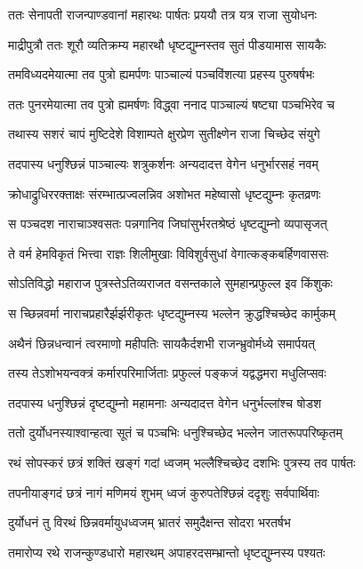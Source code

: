 \twolineshloka
{ततः सेनापती राजन्पाण्डवानां महारथः}
{पार्षतः प्रययौ तत्र यत्र राजा सुयोधनः}


\twolineshloka
{माद्रीपुत्रौ ततः शूरौ व्यतिक्रम्य महारथौ}
{धृष्टद्युम्नस्तव सुतं पीडयामास सायकैः}


\twolineshloka
{तमविध्यदमेयात्मा तव पुत्रो ह्यमर्पणः}
{पाञ्चाल्यं पञ्चविंशत्या प्रहस्य पुरुषर्षभः}


\twolineshloka
{ततः पुनरमेयात्मा तव पुत्रो ह्यमर्षणः}
{विद्ध्वा ननाद पाञ्चाल्यं षष्ट्या पञ्चभिरेव च}


\twolineshloka
{तथास्य सशरं चापं मुष्टिदेशे विशाम्पते}
{क्षुरप्रेण सुतीक्ष्णेन राजा चिच्छेद संयुगे}


\twolineshloka
{तदपास्य धनुश्छिन्नं पाञ्चाल्यः शत्रुकर्शनः}
{अन्यदादत्त वेगेन धनुर्भारसहं नवम्}


\twolineshloka
{क्रोधाद्रुधिररक्ताक्षः संरम्भात्प्रज्वलन्निव}
{अशोभत महेष्वासो धृष्टद्युम्नः कृतव्रणः}


\twolineshloka
{स पञ्चदश नाराचाञ्श्वसतः पन्नगानिव}
{जिघांसुर्भरतश्रेष्ठं धृष्टद्युम्नो व्यपासृजत्}


\twolineshloka
{ते वर्म हेमविकृतं भित्त्वा राज्ञः शिलीमुखाः}
{विविशुर्वसुधां वेगात्कङ्कबर्हिणवाससः}


\twolineshloka
{सोऽतिविद्धो महाराज पुत्रस्तेऽतिव्यराजत}
{वसन्तकाले सुमहान्प्रफुल्ल इव किंशुकः}


\twolineshloka
{स च्छिन्नवर्मा नाराचप्रहारैर्झर्झरीकृतः}
{धृष्टद्युम्नस्य भल्लेन क्रुद्धश्चिच्छेद कार्मुकम्}


\twolineshloka
{अथैनं छिन्नधन्वानं त्वरमाणो महीपतिः}
{सायकैर्दशभी राजन्भ्रुवोर्मध्ये समार्पयत्}


\twolineshloka
{तस्य तेऽशोभयन्वक्त्रं कर्मारपरिमार्जिताः}
{प्रफुल्लं पङ्कजं यद्वद्धमरा मधुलिप्सवः}


\twolineshloka
{तदपास्य धनुश्छिन्नं दृष्टद्युम्नो महामनाः}
{अन्यदादत्त वेगेन धनुर्भल्लांश्च षोडश}


\twolineshloka
{ततो दुर्योधनस्याश्वान्हत्वा सूतं च पञ्चभिः}
{धनुश्चिच्छेद भल्लेन जातरूपपरिष्कृतम्}


\twolineshloka
{रथं सोपस्करं छत्रं शक्तिं खङ्गं गदां ध्वजम्}
{भल्लैश्चिच्छेद दशभिः पुत्रस्य तव पार्षतः}


\twolineshloka
{तपनीयाङ्गदं छत्रं नागं मणिमयं शुभम्}
{ध्वजं कुरुपतेश्छिन्नं ददृशुः सर्वपार्थिवाः}


\twolineshloka
{दुर्योधनं तु विरथं छिन्नवर्मायुधध्वजम्}
{भ्रातरं समुदैक्षन्त सोदरा भरतर्षभ}


\twolineshloka
{तमारोप्य रथे राजन्कुण्डधारो महारथम्}
{अपाहरदसम्भ्रान्तो धृष्टद्युम्नस्य पश्यतः}


